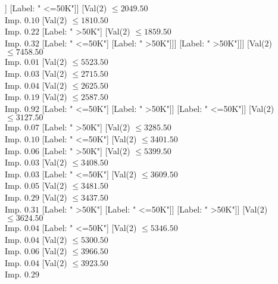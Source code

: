 \documentclass[margin=10pt]{standalone}
\begin{document}
\begin{forest}
													[Label: " >50K"]
													[Label: " <=50K"]]
												[Label: " <=50K"]]
											[Val($2$) $ \leq 2049.50$ \\ Imp. $0.10$
												[Val($2$) $ \leq 1810.50$ \\ Imp. $0.22$
													[Label: " >50K"]
													[Val($2$) $ \leq 1859.50$ \\ Imp. $0.32$
														[Label: " <=50K"]
														[Label: " >50K"]]]
												[Label: " >50K"]]]
										[Val($2$) $ \leq 7458.50$ \\ Imp. $0.01$
											[Val($2$) $ \leq 5523.50$ \\ Imp. $0.03$
												[Val($2$) $ \leq 2715.50$ \\ Imp. $0.04$
													[Val($2$) $ \leq 2625.50$ \\ Imp. $0.19$
														[Val($2$) $ \leq 2587.50$ \\ Imp. $0.92$
															[Label: " <=50K"]
															[Label: " >50K"]]
														[Label: " <=50K"]]
													[Val($2$) $ \leq 3127.50$ \\ Imp. $0.07$
														[Label: " >50K"]
														[Val($2$) $ \leq 3285.50$ \\ Imp. $0.10$
															[Label: " <=50K"]
															[Val($2$) $ \leq 3401.50$ \\ Imp. $0.06$
																[Label: " >50K"]
																[Val($2$) $ \leq 5399.50$ \\ Imp. $0.03$
																	[Val($2$) $ \leq 3408.50$ \\ Imp. $0.03$
																		[Label: " <=50K"]
																		[Val($2$) $ \leq 3609.50$ \\ Imp. $0.05$
																			[Val($2$) $ \leq 3481.50$ \\ Imp. $0.29$
																				[Val($2$) $ \leq 3437.50$ \\ Imp. $0.31$
																					[Label: " >50K"]
																					[Label: " <=50K"]]
																				[Label: " >50K"]]
																			[Val($2$) $ \leq 3624.50$ \\ Imp. $0.04$
																				[Label: " <=50K"]
																				[Val($2$) $ \leq 5346.50$ \\ Imp. $0.04$
																					[Val($2$) $ \leq 5300.50$ \\ Imp. $0.06$
																						[Val($2$) $ \leq 3966.50$ \\ Imp. $0.04$
																							[Val($2$) $ \leq 3923.50$ \\ Imp. $0.29$

\end{forest}
\end{document}
